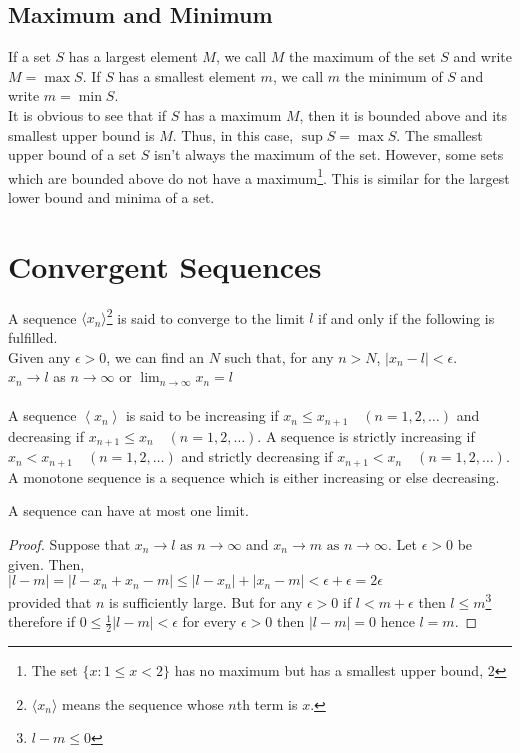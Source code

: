 \documentclass[10pt, a4paper]{article}
\newcommand{\limas}[3][n]{#2 \rightarrow #3 \text{ as } #1 \rightarrow \infty}
\newcommand{\seq}[1][x_n]{\left\langle #1 \right\rangle}
\begin{document}
\subsection{Maximum and Minimum}
If a set $S$ has a largest element $M$, we call $M$ the maximum of the set $S$ and write $M = \max{S}$. If $S$ has a smallest element $m$, we call $m$ the minimum of $S$ and write $m = \min{S}.$ \\
It is obvious to see that if $S$ has a maximum $M$, then it is bounded above and its smallest upper bound is $M$. Thus, in this case, $\sup{S} = \max{S}$. The smallest upper bound of a set $S$ isn't always the maximum of the set. However, some sets which are bounded above do not have a maximum\footnote{The set $\{ x : 1 \leq x < 2 \}$ has no maximum but has a smallest upper bound, $2$}. This is similar for the largest lower bound and minima of a set.

\newpage

\section{Convergent Sequences}
A sequence $\langle x_{n} \rangle$\footnote{$\langle x_n \rangle$ means the sequence whose $n$th term is $x$.} is said to converge to the limit $l$ if and only if the following is fulfilled. \\
Given any $\epsilon > 0$, we can find an $N$ such that, for any $n > N$, $|x_n - l| < \epsilon$. \\
$x_n \rightarrow l$ as $n \rightarrow \infty$ or $\displaystyle\lim_{n \rightarrow \infty} x_n = l$ \\
\\
A sequence $\seq$ is said to be increasing if $x_n \leq x_{n + 1}\quad(n = 1, 2, \dots)$ and decreasing if $x_{n + 1} \leq x_n\quad(n = 1, 2, \dots)$. A sequence is strictly increasing if $x_n < x_{n + 1}\quad(n = 1, 2, \dots)$ and strictly decreasing if $x_{n + 1} < x_n\quad(n = 1, 2, \dots)$. A monotone sequence is a sequence which is either increasing or else decreasing.

\begin{theorem}\label{thm_oneLimit}
    A sequence can have at most one limit.
    \begin{proof}
        Suppose that $\limas{x_n}{l}$ and $\limas{x_n}{m}$. Let $\epsilon > 0$ be given. Then, \\
        $|l - m| = |l - x_n + x_n - m| \leq |l - x_n| + |x_n - m| < \epsilon + \epsilon = 2\epsilon$ \\
        provided that $n$ is sufficiently large. But for any $\epsilon > 0$ if $l < m + \epsilon$ then $l \leq m$\footnote{$l - m \leq 0$} therefore if $0 \leq \frac{1}{2}|l - m| < \epsilon$ for every $\epsilon > 0$ then $|l - m| = 0$ hence $l = m$.
    \end{proof}
\end{theorem}
\end{document}
